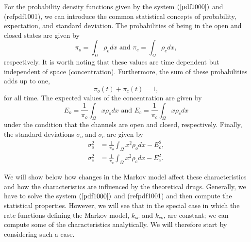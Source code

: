 \bigskip For the probability density functions given by the system $\left(
\ref{pdf1000}\right)$ and (ref{pdf1001}), we can introduce the common statistical
concepts of probability, expectation, and standard deviation. The probabilities of
being in the open and closed states are given by
\begin{equation}
\pi_{o}=\int_{\Omega}\rho_{o}dx \text{ and }\pi_{c}=\int_{\Omega}\rho_{c}dx,
\label{probability}
\end{equation}
respectively. It is worth noting that these values are time dependent but
independent of space (concentration). Furthermore, the sum of these
probabilities adds up to one,
\[
\pi_{o}\left(  t\right)  +\pi_{c}\left(  t\right)  =1,
\]
for all time. The expected values of the concentration are given by
\begin{equation}
E_{o}=\frac{1}{\pi_{o}}\int_{\Omega}x\rho_{o}dx \text{ and }E_{c}=\frac{1}
{\pi_{c}}\int_{\Omega}x\rho_{c}dx \label{expectation}
\end{equation}
under the condition that the channels are open and closed, respectively. Finally, the standard deviations $\sigma_{o}$ and $\sigma_{c}$ are given by
\begin{align}
\sigma_{o}^{2}  &  =\frac{1}{\pi_{o}}\int_{\Omega}x^{2}\rho_{o}dx-E_{o}^{2},\label{stdvo}\\
\sigma_{c}^{2}  &  =\frac{1}{\pi_{c}}\int_{\Omega}x^{2}\rho_{c}dx-E_{c}^{2}. \label{stdvc}
\end{align}

We will show below how changes in the Markov model affect these
characteristics and how the characteristics are influenced by the
theoretical drugs. Generally, we have to solve the system $\left(
\ref{pdf1000}\right)$ and (ref{pdf1001}) and then compute the statistical
properties. However, we will see that in the special case in which the rate functions
defining the Markov model, $k_{oc}$ and $k_{co}$, are constant; we can compute some of
the characteristics analytically.  We will therefore start by considering such a case.



